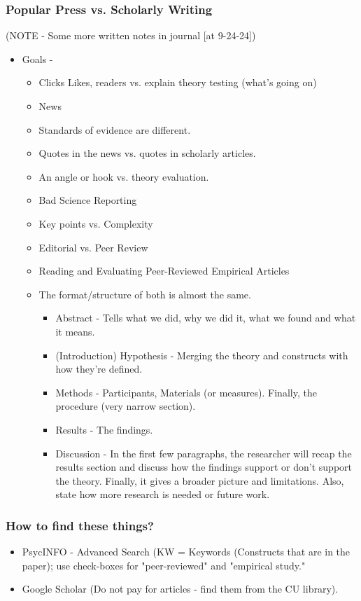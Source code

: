 \documentclass{report}
\begin{document}
\subsubsection{Popular Press vs. Scholarly Writing}
(NOTE - Some more written notes in journal [at 9-24-24]) 
\begin{itemize}
    \item Goals - 
    \begin{itemize}
        \item Clicks Likes, readers vs. explain theory testing (what's going on)
        \item News
        \item Standards of evidence are different. 
        \item Quotes in the news vs. quotes in scholarly articles.
        \item An angle or hook vs. theory evaluation. 
        \item Bad Science Reporting
        \item Key points vs. Complexity
        \item Editorial vs. Peer Review
        \item Reading and Evaluating Peer-Reviewed Empirical Articles
        \item The format/structure of both is almost the same. 
        \begin{itemize}
            \item Abstract - Tells what we did, why we did it, what we found and what it means. 
            \item (Introduction) Hypothesis - Merging the theory and constructs with how they're defined.
            \item Methods - Participants, Materials (or measures). Finally, the procedure (very narrow section). 
            \item Results - The findings.
            \item Discussion - In the first few paragraphs, the researcher will recap the results section and discuss how the findings support or don't support the theory. Finally, it gives a broader picture and limitations. Also, state how more research is needed or future work. 
        \end{itemize}
    \end{itemize}
\end{itemize}

\subsubsection{How to find these things?}
\begin{itemize}
    \item PsycINFO - Advanced Search (KW = Keywords (Constructs that are in the paper); use check-boxes for "peer-reviewed" and "empirical study." 
    \item Google Scholar (Do not pay for articles - find them from the CU library).
\end{itemize}
\end{document}
